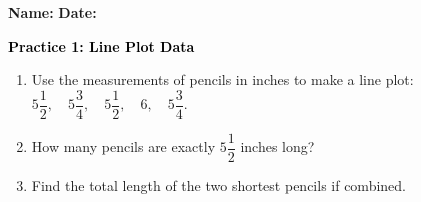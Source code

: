 \documentclass[12pt, letterpaper, fleqn]{article}
\begin{document}
\textbf{Name:} \underline{\hspace{5cm}}
\hfill
\textbf{Date:} \underline{\hspace{3cm}}\\

\begin{tcolorbox}[colback=customteal!20]
    \large\textcolor{black}{\textbf{Practice 1: Line Plot Data}}
\end{tcolorbox}
\begin{enumerate}[itemsep=3.5cm, leftmargin=0.6cm]
\item Use the measurements of pencils in inches to make a line plot: $5\dfrac{1}{2}, \quad 5\dfrac{3}{4}, \quad 5\dfrac{1}{2}, \quad 6, \quad 5\dfrac{3}{4}$.
\vspace{4cm}
\item How many pencils are exactly $5\dfrac{1}{2}$ inches long?
\vspace{3cm}
\item Find the total length of the two shortest pencils if combined.
\end{enumerate}
\end{document}
